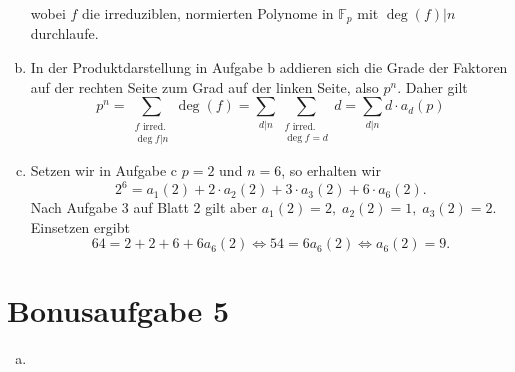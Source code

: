 \documentclass{article}
\begin{document}
\begin{enumerate}[(a)]
\[        \]
        wobei $f$ die irreduziblen, normierten Polynome in $\mathbb{F}_p$ mit $\deg (f)|n$ durchlaufe.
        \item In der Produktdarstellung in Aufgabe b addieren sich die Grade der Faktoren auf der rechten Seite zum Grad auf der linken Seite, also $p^n$. Daher gilt
        \[
            p^n = \sum_{\substack{f\text{ irred.}\\\deg f | n}} \deg(f) = \sum_{d | n} \sum_{\substack{f\text{ irred.}\\\deg f = d}} d = \sum_{d | n} d \cdot a_d(p)
        \]
        \item Setzen wir in Aufgabe c $p = 2$ und $n = 6$, so erhalten wir
        \[
            2^6 = a_1(2) + 2\cdot a_2(2) + 3 \cdot a_3(2) + 6 \cdot a_6(2). 
        \]
        Nach Aufgabe 3 auf Blatt 2 gilt aber $a_1(2) = 2,\; a_2(2) = 1,\; a_3(2) = 2$. Einsetzen ergibt
        \[
            64 = 2 + 2 + 6 + 6 a_6(2) \Leftrightarrow 54 = 6 a_6(2) \Leftrightarrow a_6(2) = 9.
        \]
    \end{enumerate}
    \section*{Bonusaufgabe 5}
    \begin{enumerate}[(a)]
        \item 
    \end{enumerate}
\end{document}
